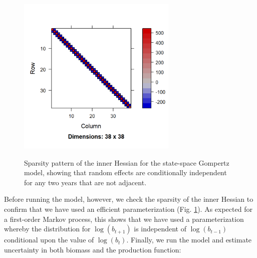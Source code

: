 \lstset{style=Rcode}


\begin{figure}[!ht]
    \caption[Sparsity pattern for first-order autoregressive process]{Sparsity pattern of the inner Hessian for the state-space Gompertz model, showing that random effects are conditionally independent for any two years that are not adjacent.}
    \centering
    \includegraphics[width=3in]{Chap_3/gompertz_sparsity.png}
    \label{fig:Chap3_hessian}
\end{figure}

Before running the model, however, we check the sparsity of the inner Hessian to confirm that we have used an efficient parameterization (Fig. \ref{fig:Chap3_hessian}). As expected for a first-order Markov process, this shows that we have used a parameterization whereby the distribution for \(\log(b_{t+1})\) is independent of \(\log(b_{t-1})\) conditional upon the value of \(\log(b_{t})\).  Finally, we run the model and estimate uncertainty in both biomass and the production function:

